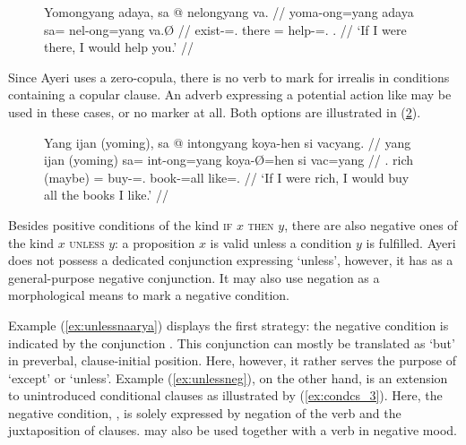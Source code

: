 \begin{figure}
\ex\label{ex:condcntfact}\begingl
	\gla Yomongyang adaya, sa @ nelongyang va. //
	\glb yoma-ong=yang adaya sa= nel-ong=yang va.Ø //
	\glc exist-\Irr{}=\Fsg{}.\Aarg{} there \PatT{}= help-\Irr{}=\Fsg{}.\Aarg{} 
		\Second{}.\Parg{} //
	\glft `If I were there, I would help you.' //
\endgl\xe
\end{figure}

Since Ayeri uses a zero-copula, there is no verb to mark for irrealis in
conditions containing a copular clause. An adverb expressing a potential action
like  may be used in these cases, or
no marker at all. Both options are illustrated in (\ref{ex:copcond}).

\begin{figure}
\ex\label{ex:copcond}\begingl
	\gla Yang ijan \textup{(}yoming\textup{)}, sa @ intongyang koya-hen si
		vacyang. //
	\glb yang ijan (yoming) sa= int-ong=yang koya-Ø=hen si vac=yang //
	\glc \Fsg{}.\Aarg{} rich (maybe) \PatT{}= buy-\Irr{}=\Fsg{}.\Aarg{}
		book-\Top{}=all \Rel{} like=\Fsg{}.\Aarg{} //
	\glft `If I were rich, I would buy all the books I like.' //
\endgl\xe
\end{figure}

Besides positive conditions of the kind \textsc{if} $x$ \textsc{then} $y$,
there are also negative ones of the kind $x$ \textsc{unless} $y$: a proposition
$x$ is valid unless a condition $y$ is fulfilled. Ayeri does not possess a
dedicated conjunction expressing `unless', however, it has 
as a general-purpose negative conjunction. It may also use negation as a
morphological means to mark a negative condition.

Example (\ref{ex:unlessnaarya}) displays the first strategy: the negative
condition is indicated by the conjunction . This conjunction
can mostly be translated as `but' in preverbal, clause-initial position. Here,
however, it rather serves the purpose of `except' or `unless'. Example
(\ref{ex:unlessneg}), on the other hand, is an extension to unintroduced
conditional clauses as illustrated by (\ref{ex:condcs_3}). Here, the negative
condition, , is solely
expressed by negation of the verb 
and the juxtaposition of clauses.  may also be used together
with a verb in negative mood.

